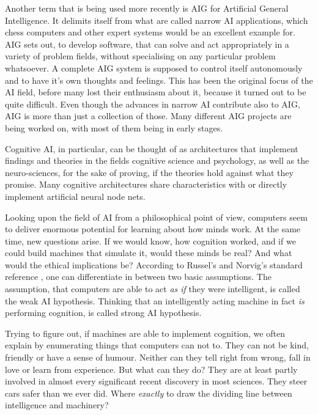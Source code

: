 Another term that is being used more recently is AIG for Artificial General Intelligence. It delimits itself from what are called narrow AI applications, which chess computers and other expert systems would be an excellent example for. AIG sets out, to develop software, that can solve and act appropriately in a variety of problem fields, without specialising on any particular problem whatsoever. A complete AIG system is supposed to control itself autonomously and to have it's own thoughts and feelings. This has been the original focus of the AI field, before many lost their enthusiasm about it, because it turned out to be quite difficult. Even though the advances in narrow AI contribute also to AIG, AIG is more than just a collection of those. Many different AIG projects are being worked on, with most of them being in early stages.\cite{goertzel2007artificial}

Cognitive AI, in particular, can be thought of as architectures that implement findings and theories in the fields cognitive science and psychology, as well as the neuro-sciences, for the sake of proving, if the theories hold against what they promise. Many cognitive architectures share characteristics with or directly implement artificial neural node nets.

Looking upon the field of AI from a philosophical point of view, computers seem to deliver enormous potential for learning about how minds work. At the same time, new questions arise. If we would know, how cognition worked, and if we could build machines that simulate it, would these minds be real? And what would the ethical implications be? According to Russel's and Norvig's standard reference \cite{russell2009artificial}, one can differentiate in between two basic assumptions. The assumption, that computers are able to act \emph{as if} they were intelligent, is called the weak AI hypothesis. Thinking that an intelligently acting machine in fact \emph{is} performing cognition, is called strong AI hypothesis.

Trying to figure out, if machines are able to implement cognition, we often explain by enumerating things that computers can not to. They can not be kind, friendly or have a sense of humour. Neither can they tell right from wrong, fall in love or learn from experience. But what can they do? They are at least partly involved in almost every significant recent discovery in most sciences. They steer cars safer than we ever did. Where \emph{exactly} to draw the dividing line between intelligence and machinery?~\cite{russell2009artificial}

